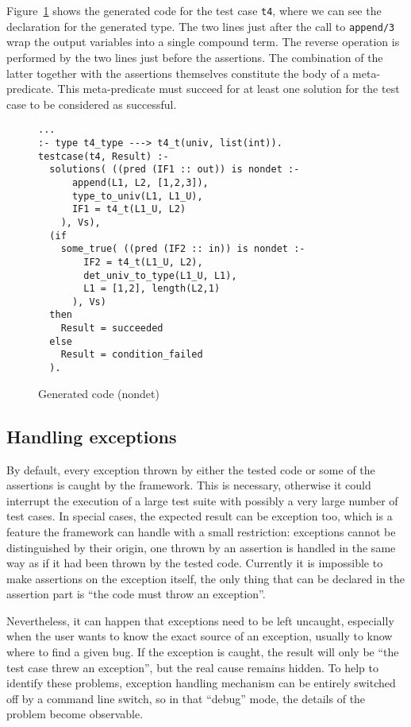\documentclass[british]{llncs}
\begin{document}
Figure~\ref{fig:Generated-code-nondet} shows the generated code
for the test case \texttt{t4}, where we can see the declaration for
the generated type. The two lines just after the call to \texttt{append/3}
wrap the output variables into a single compound term. The reverse
operation is performed by the two lines just before the assertions. The combination of the latter together with the assertions themselves constitute the body of a meta-predicate.
This meta-predicate must succeed for at least one solution for
the test case to be considered as successful.

\begin{figure}[h]
{\scriptsize 
\begin{lstlisting}[basicstyle={\small\ttfamily},breaklines=true]
...
:- type t4_type ---> t4_t(univ, list(int)).
testcase(t4, Result) :-
  solutions( ((pred (IF1 :: out)) is nondet :-
      append(L1, L2, [1,2,3]),
      type_to_univ(L1, L1_U),
      IF1 = t4_t(L1_U, L2)
    ), Vs),
  (if
    some_true( ((pred (IF2 :: in)) is nondet :- 
        IF2 = t4_t(L1_U, L2),
        det_univ_to_type(L1_U, L1),
        L1 = [1,2], length(L2,1)
      ), Vs)
  then
    Result = succeeded
  else
    Result = condition_failed
  ).
\end{lstlisting}
}\caption{\label{fig:Generated-code-nondet}Generated code (nondet)}

\end{figure}



\subsection{Handling exceptions}

By default, every exception thrown by either the tested code or some
of the assertions is caught by the framework. This is necessary,
otherwise it could interrupt the execution of a large test suite with
possibly a very large number of test cases. In special cases, the expected
result can be exception too, which is a feature the framework can
handle with a small restriction: exceptions cannot be
distinguished by their origin, one thrown by an assertion is handled
in the same way as if it had been thrown by the tested code. Currently
it is impossible to make assertions on the exception itself, the only
thing that can be declared in the assertion part is {}``the code must
throw an exception''.

Nevertheless, it can happen that exceptions need to be left uncaught,
especially when the user wants to know the exact source of an exception,
usually to know where to find a given bug. 
If the
exception is caught, the result will only be {}``the test case threw
an exception'', but the real cause remains hidden. To help to identify
these problems, exception handling mechanism can be entirely switched
off by a command line switch, so in that {}``debug'' mode, the details
of the problem become observable.
\end{document}

